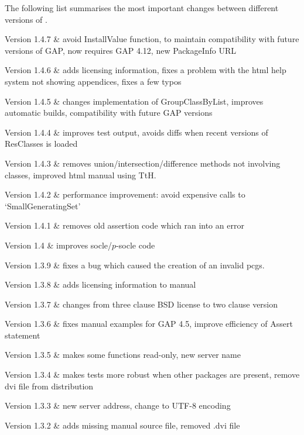 
The following list summarises the most important changes between different versions of \CRISP.

\beginitems
Version 1.4.7 &
	avoid InstallValue function, to maintain compatibility with future versions of GAP, now requires GAP 4.12, new PackageInfo URL

Version 1.4.6 &
	adds licensing information, fixes a problem with the html help system not showing appendices, fixes a few typos
	
Version 1.4.5 &
	changes implementation of GroupClassByList, improves automatic builds, compatibility with future GAP versions
	
Version  1.4.4 &
	improves test output, avoids diffs when recent versions of ResClasses is loaded

Version 1.4.3 &
	removes union/intersection/difference methods not involving classes, improved html manual using TtH.

Version 1.4.2 & 
	performance improvement: avoid expensive calls to `SmallGeneratingSet'
	
Version 1.4.1 &
	removes old assertion code which ran into an error
	
Version 1.4 &
	improves socle/$p$-socle code
	
Version 1.3.9 &
	fixes a bug which caused the creation of an invalid pcgs.
	
Version 1.3.8 &
	adds licensing information to manual
	
Version 1.3.7 &
	changes from three clause BSD license to two clause version
	
Version 1.3.6 & 
	fixes manual examples for GAP 4.5, improve efficiency of Assert statement
	
Version 1.3.5 &
	makes some functions read-only, new server name
	
Version 1.3.4 & 
	makes tests more robust when other packages are present, remove dvi file from distribution
	
Version 1.3.3 &	
	new server address, change to UTF-8 encoding
	
Version 1.3.2 &
	adds missing manual source file, removed .dvi file
	
